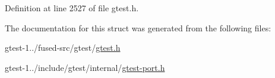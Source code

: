 \-Definition at line 2527 of file gtest.\-h.



\-The documentation for this struct was generated from the following files\-:\begin{DoxyCompactItemize}
\item 
gtest-\/1../fused-\/src/gtest/\hyperlink{fused-src_2gtest_2gtest_8h}{gtest.\-h}\item 
gtest-\/1../include/gtest/internal/\hyperlink{gtest-port_8h}{gtest-\/port.\-h}\end{DoxyCompactItemize}
